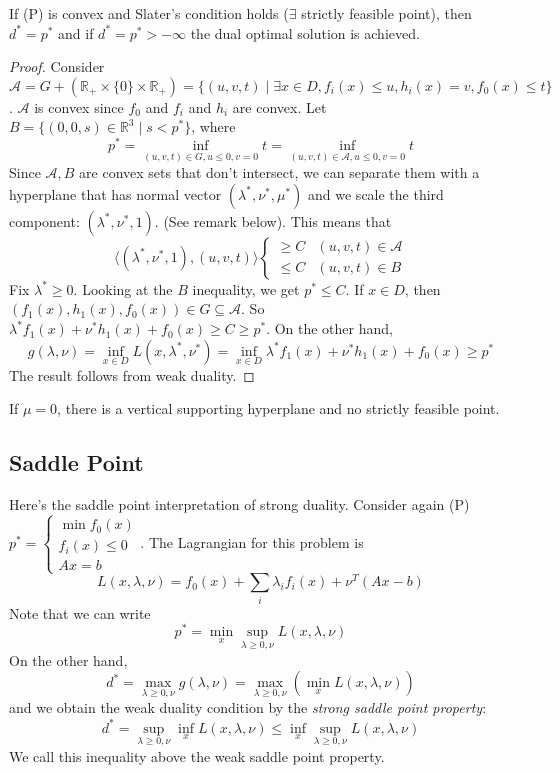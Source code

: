 \documentclass[english, 11pt]{article}
\begin{document}
\begin{thrm}
If (P) is convex and Slater's condition holds ($\exists$ strictly feasible point), then $d^* = p^*$ and if $d^* = p^* >-\infty$ the dual optimal solution is achieved.
\end{thrm}
\begin{proof}
Consider $\mathcal{A} = G + (\mathbb{R}_+ \times \{0 \} \times \mathbb{R}_+) = \{(u,v,t) \mid \exists x \in D, f_i(x) \le u, h_i(x) = v, f_0(x) \le t \}$. $\mathcal{A}$ is convex since $f_0$ and $f_i$ and $h_i$ are convex. Let $B = \{(0,0,s) \in \mathbb{R}^3 \mid s < p^* \}$, where 
\[
p^* = \inf \limits_{(u,v,t) \in G, u \le 0, v=0} t
= \inf \limits_{(u,v,t) \in \mathcal{A}, u \le 0, v=0} t
\]
Since $\mathcal{A}, B$ are convex sets that don't intersect, we can separate them with a hyperplane that has normal vector $(\lambda^* , \nu^*, \mu^*)$ and we scale the third component: $(\lambda^*, \nu^*, 1)$. (See remark below). This means that
\[
\langle (\lambda^*, \nu^*, 1), (u,v,t ) \rangle \begin{cases}
\ge C & (u,v,t) \in \mathcal{A} \\
\le C & (u,v,t) \in B
\end{cases}
\]
Fix $\lambda^* \ge 0$. Looking at the $B$ inequality, we get $p^* \le C $. If $x \in D$, then $(f_1(x), h_1(x), f_0(x)) \in G \subseteq \mathcal{A}$. So $\lambda^* f_1(x) + \nu^* h_1(x) + f_0(x) \ge C \ge p^*$. On the other hand,
\[
g(\lambda,\nu) = \inf \limits_{x \in D} L(x,\lambda^*,\nu^*) = \inf \limits_{x \in D} \lambda^* f_1(x) + \nu^* h_1(x) + f_0(x) \ge p^*
\]
The result follows from weak duality.
\end{proof}

\begin{rem}
If $\mu=0$, there is a vertical supporting hyperplane and no strictly feasible point.
\end{rem}


\subsection{Saddle Point}
Here's the saddle point interpretation of strong duality. Consider again (P)
$p^*=\begin{cases} \min f_0(x) \\ f_i(x) \le 0 \\ Ax =b \end{cases}$. The Lagrangian for this problem is
\[
L(x,\lambda,\nu) = f_0(x) + \sum_i \lambda_i f_i(x) + \nu^T (Ax-b)
\]
Note that we can write
\[ p^* = \min \limits_x \sup \limits_{\lambda \ge 0, \nu} L(x,\lambda,\nu)
\]
On the other hand,
\[
d^* = \max \limits_{\lambda \ge 0, \nu} g(\lambda,\nu) = \max \limits_{\lambda \ge 0, \nu} \left( \min \limits_{x} L(x,\lambda,\nu) \right)
\]
and we obtain the weak duality condition by the {\it strong saddle point property}:
\[
d^* = \sup \limits_{\lambda \ge 0, \nu} \inf \limits_x L(x,\lambda,\nu) \le \inf \limits_x \sup \limits_{\lambda \ge 0, \nu} L(x,\lambda,\nu)
\]
We call this inequality above the weak saddle point property.
\end{document}
